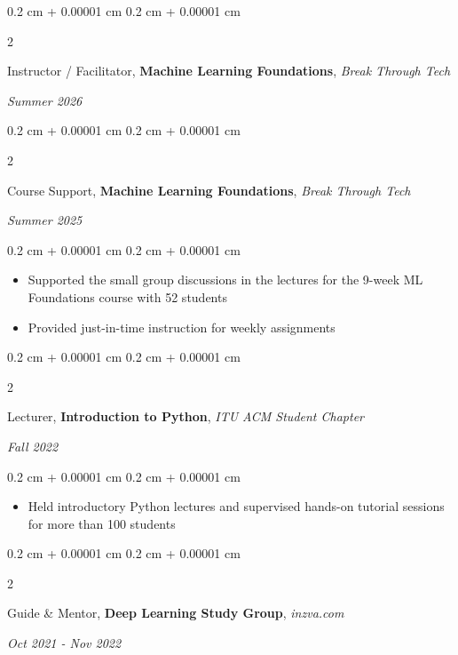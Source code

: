 \documentclass[10pt, letterpaper]{article}
\newenvironment{highlights}{
    \begin{itemize}[
        topsep=0.10 cm,
        parsep=0.10 cm,
        partopsep=0pt,
        itemsep=0pt,
        leftmargin=0.4 cm + 10pt
    ]
}{
    \end{itemize}
} %
\newenvironment{onecolentry}{
    \begin{adjustwidth}{
        0.2 cm + 0.00001 cm
    }{
        0.2 cm + 0.00001 cm
    }
}{
    \end{adjustwidth}
} %
\newenvironment{twocolentry}[2][]{
    \onecolentry
    \def\secondColumn{#2}
    \setcolumnwidth{\fill, 4.5 cm}
    \begin{paracol}{2}
}{
    \switchcolumn \raggedleft \secondColumn
    \end{paracol}
    \endonecolentry
} %
\begin{document}
        \vspace{0.2 cm}
        \begin{twocolentry}{
            
        \textit{Summer 2026}}
            {Instructor /  Facilitator, \textbf{Machine Learning Foundations}}, \textit{Break Through Tech}
        \end{twocolentry}

        \begin{twocolentry}{
            
            
        \textit{Summer 2025}}
            {Course Support, \textbf{Machine Learning Foundations}}, \textit{Break Through Tech}
        \end{twocolentry}

        \vspace{0.10 cm}
        \begin{onecolentry}
            \begin{highlights}
                \item Supported the small group discussions in the lectures for the 9-week ML Foundations course with 52 students
                \item Provided just-in-time instruction for weekly assignments
            \end{highlights}
        \end{onecolentry}


        \vspace{0.2 cm}
        \begin{twocolentry}{
            
            
        \textit{Fall 2022}}
            {Lecturer}, \textbf{Introduction to Python}, \textit{ITU ACM Student Chapter}
        \end{twocolentry}

        \vspace{0.10 cm}
        \begin{onecolentry}
            \begin{highlights}
                \item Held introductory Python lectures and supervised hands-on tutorial sessions for more than 100 students 
            \end{highlights}
        \end{onecolentry}


        \vspace{0.2 cm}

        \begin{twocolentry}{
            
            
        \textit{Oct 2021 - Nov 2022}}
            Guide \& Mentor, \textbf{Deep Learning Study Group}, \textit{inzva.com}
        \end{twocolentry}
\end{document}

